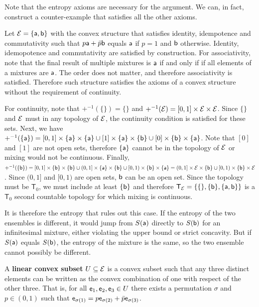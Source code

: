 \begin{remark}
	Note that the entropy axioms are necessary for the argument. We can, in fact, construct a counter-example that satisfies all the other axioms.
	
	Let $\Ens = \{\ens[a], \ens[b]\}$ with the convex structure that satisfies identity, idempotence and commutativity such that $p \ens[a] + \bar{p} \ens[b]$ equals $\ens[a]$ if $p=1$ and $\ens[b]$ otherwise. Identity, idemopotence and commutativity are satisfied by construction. For associativity, note that the final result of multiple mixtures is $\ens[a]$ if and only if if all elements of a mixtures are $\ens[a]$. The order does not matter, and therefore associativity is satisfied. Therefore such structure satisfies the axioms of a convex structure without the requirement of continuity.
	
	For continuity, note that $+^{-1}(\{\}) = \{\}$ and $+^{-1}(\Ens) = [0,1] \times \Ens \times \Ens$. Since $\{\}$ and $\Ens$ must in any topology of $\Ens$, the continuity condition is satisfied for these sets. Next, we have  $+^{-1}(\{\ens[a]\}) = [0,1] \times \{\ens[a]\} \times \{\ens[a]\} \cup [1] \times \{\ens[a]\} \times \{\ens[b]\} \cup [0] \times \{\ens[b]\} \times \{\ens[a]\}$. Note that $[0]$ and $[1]$ are not open sets, therefore $\{\ens[a]\}$ cannot be in the topology of $\Ens$ or mixing would not be continuous. Finally, $+^{-1}(\{\ens[b]\}) = [0,1] \times \{\ens[b]\} \times \{\ens[b]\} \cup (0,1] \times \{\ens[a]\} \times \{\ens[b]\} \cup [0,1) \times \{\ens[b]\} \times \{\ens[a]\} = (0,1] \times \Ens \times \{\ens[b]\} \cup [0,1) \times \{\ens[b]\} \times \Ens$. Since $(0,1]$ and $[0,1)$ are open sets, $\ens[b]$ can be an open set. Since the topology must be $\textsf{T}_0$, we must include at least $\{\ens[b]\}$ and therefore $\mathsf{T}_{\Ens} = \{\{\}, \{\ens[b]\}, \{\ens[a], \ens[b]\}\}$ is a $\mathsf{T}_0$ second countable topology for which mixing is continuous.
	
	It is therefore the entropy that rules out this case. If the entropy of the two ensembles is different, it would jump from $S(\ens[a])$ directly to $S(\ens[b])$ for an infinitesimal mixture, either violating the upper bound or strict concavity. But if $S(\ens[a])$ equals $S(\ens[b])$, the entropy of the mixture is the same, so the two ensemble cannot possibly be different.
\end{remark}


\begin{defn}
	A \textbf{linear convex subset} $U \subseteq \Ens$ is a convex subset such that any three distinct elements can be written as the convex combination of one with respect of the other three. That is, for all $\ens_1, \ens_2, \ens_3 \in U$ there exists a permutation $\sigma$ and $p \in (0,1)$ such that $\ens_{\sigma(1)} = p \ens_{\sigma(2)} + \bar{p} \ens_{\sigma(3)}	$.
\end{defn}

